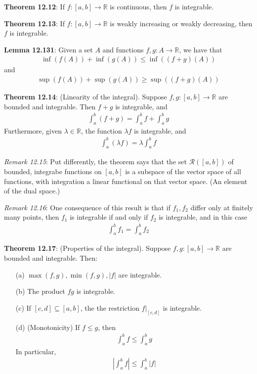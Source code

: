 \documentclass[11pt]{article}
\begin{document}
\textbf{Theorem 12.12}: If $f:[a,b] \to \mathbb{R}$ is continuous, then $f$ is integrable.

\textbf{Theorem 12.13}: If $f: [a,b] \to \mathbb{R}$ is weakly increasing or weakly decreasing, then $f$ is integrable.

\textbf{Lemma 12.131}: Given a set $A$ and functions $f, g: A \to \mathbb{R}$, we have that 
\begin{align*}
    \inf(f(A)) + \inf(g(A)) \leq \inf((f+g)(A))
\end{align*}
and
\begin{align*}
    \sup(f(A)) + \sup(g(A)) \geq \sup((f+g)(A))
\end{align*}


\textbf{Theorem 12.14}: (Linearity of the integral). Suppose $f,g:[a,b] \to \mathbb{R}$ are bounded and integrable. Then $f+g$ is integrable, and 
\begin{align*}
    \int_a^b (f+g) = \int_a^b f + \int_a^b g
\end{align*}
Furthermore, given $\lambda \in \mathbb{R}$, the function $\lambda f$ is integrable, and 
\begin{align*}
    \int_a^b (\lambda f) = \lambda \int_a^b f
\end{align*}

\textit{Remark 12.15}: Put differently, the theorem says that the set $\mathcal{R}([a,b])$ of bounded, integrabe functions on $[a,b]$ is a subspace of the vector space of all functions, with integration a linear functional on that vector space. (An element of the dual space.)

\textit{Remark 12.16}: One consequence of this result is that if $f_1, f_2$ differ only at finitely many points, then $f_1$ is integrable if and only if $f_2$ is integrable, and in this case
\begin{align*}
    \int_a^b f_1 = \int_a^b f_2 
\end{align*}

\textbf{Theorem 12.17}: (Properties of the integral). Suppose $f, g:[a,b] \to \mathbb{R}$ are bounded and integrable. Then:
\begin{enumerate}
    \item [(a)] $\max(f,g), \min(f,g), |f|$ are integrable.
    \item [(b)] The product $fg$ is integrable.
    \item [(c)] If $[c,d] \subseteq [a,b]$, the the restriction $f|_{[c,d]}$ is integrable.
    \item [(d)] (Monotonicity) If $f \leq g$, then 
    \begin{align*}
        \int_a^b f \leq \int_a^b g
    \end{align*}
    In particular, 
    \begin{align*}
        |\int_a^b f| \leq \int_a^b |f|
    \end{align*}
\end{enumerate}
\end{document}
